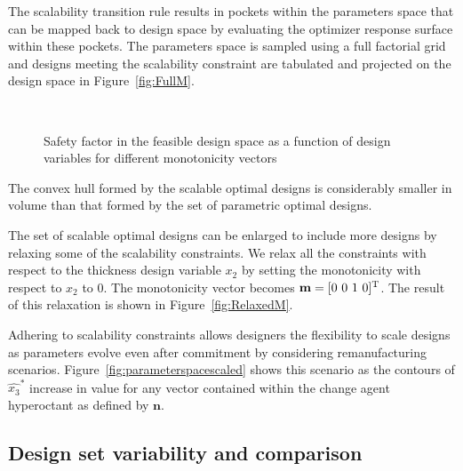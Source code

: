 The scalability transition rule results in pockets within the parameters space that can be mapped back to design space by evaluating the optimizer response surface within these pockets. The parameters space is sampled using a full factorial grid and designs meeting the scalability constraint are tabulated and projected on the design space in Figure~\ref{fig:FullM}.
\begin{figure*}[h!]
	\centering
	\\
	\caption{Safety factor in the feasible design space as a function of design variables for different monotonicity vectors}
	\label{fig:designspace}
\end{figure*}

The convex hull formed by the scalable optimal designs is considerably smaller in volume than that formed by the set of parametric optimal designs.

 The set of scalable optimal designs can be enlarged to include more designs by relaxing some of the scalability constraints. We relax all the constraints with respect to the thickness design variable $x_2$ by setting the monotonicity with respect to $x_2$ to $0$. The monotonicity vector becomes $\mathbf{m} = [0~0~1~0]^{\text T}$. The result of this relaxation is shown in Figure~\ref{fig:RelaxedM}.

Adhering to scalability constraints allows designers the flexibility to scale designs as parameters evolve even after commitment by considering remanufacturing scenarios. Figure~\ref{fig:parameterspacescaled} shows this scenario as the contours of $\hat{x_3}^{*}$ increase in value for any vector contained within the change agent hyperoctant as defined by $\mathbf{n}$.

\subsection{Design set variability and comparison} \label{subsec:dspacevar}

